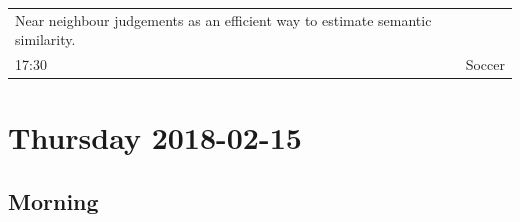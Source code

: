 \documentclass[]{article}
\begin{document}
\begin{longtable}[]{@{}lll@{}}
\begin{minipage}[t]{0.50\columnwidth}
Near neighbour judgements as an efficient way to estimate semantic
similarity.\strut
\end{minipage}\tabularnewline
\begin{minipage}[t]{0.03\columnwidth}\raggedright\strut
17:30\strut
\end{minipage} & \begin{minipage}[t]{0.39\columnwidth}\raggedright\strut
\strut
\end{minipage} & \begin{minipage}[t]{0.50\columnwidth}\raggedright\strut
Soccer\strut
\end{minipage}\tabularnewline
\bottomrule
\end{longtable}

\pagebreak  

\section{Thursday 2018-02-15}\label{thursday-2018-02-15}

\subsection{Morning}\label{morning-1}
\end{document}
